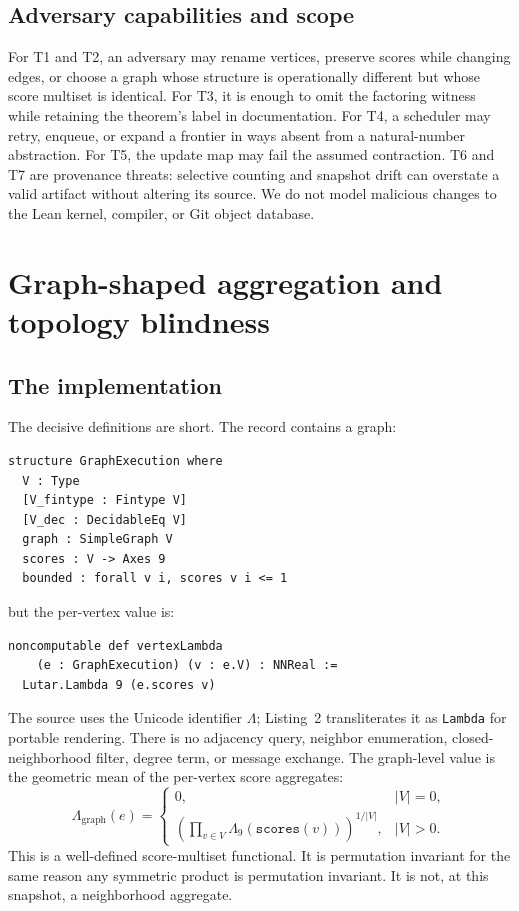 \documentclass[10pt,letterpaper]{article}
\theoremstyle{definition}
\newcommand{\Lam}{\Lambda}
\newcommand{\Lgraph}{\Lambda_{\mathrm{graph}}}
\begin{document}
\subsection{Adversary capabilities and scope}
For T1 and T2, an adversary may rename vertices, preserve scores while changing
edges, or choose a graph whose structure is operationally different but whose
score multiset is identical. For T3, it is enough to omit the factoring witness
while retaining the theorem's label in documentation. For T4, a scheduler may
retry, enqueue, or expand a frontier in ways absent from a natural-number
abstraction. For T5, the update map may fail the assumed contraction. T6 and T7
are provenance threats: selective counting and snapshot drift can overstate a
valid artifact without altering its source. We do not model malicious changes
to the Lean kernel, compiler, or Git object database.

\section{Graph-shaped aggregation and topology blindness}\label{sec:lambda}

\subsection{The implementation}
The decisive definitions are short. The record contains a graph:
\begin{lstlisting}[language={},caption={Selected fields of \texttt{GraphExecution}.}]
structure GraphExecution where
  V : Type
  [V_fintype : Fintype V]
  [V_dec : DecidableEq V]
  graph : SimpleGraph V
  scores : V -> Axes 9
  bounded : forall v i, scores v i <= 1
\end{lstlisting}
but the per-vertex value is:
\begin{lstlisting}[language={},caption={The exact score-only definition at the audited snapshot.}]
noncomputable def vertexLambda
    (e : GraphExecution) (v : e.V) : NNReal :=
  Lutar.Lambda 9 (e.scores v)
\end{lstlisting}
The source uses the Unicode identifier \(\Lam\); Listing~2 transliterates it as
\texttt{Lambda} for portable rendering. There is no adjacency query, neighbor
enumeration, closed-neighborhood filter, degree term, or message exchange.
The graph-level value is the geometric mean of the per-vertex score aggregates:
\[
\Lgraph(e)=
\begin{cases}
0, & |V|=0,\\[3pt]
\left(\prod_{v\in V}\Lam_9(\texttt{scores}(v))\right)^{1/|V|},
& |V|>0.
\end{cases}
\]
This is a well-defined score-multiset functional. It is permutation invariant
for the same reason any symmetric product is permutation invariant. It is not,
at this snapshot, a neighborhood aggregate.
\end{document}

